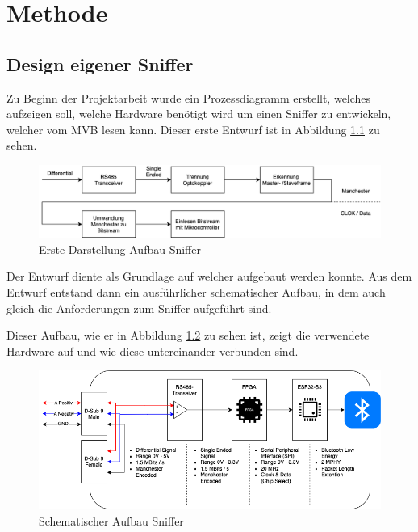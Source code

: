 \chapter{Methode} %
\label{chapter3:Methode} %

\section{Design eigener Sniffer}
\label{Design Sniffer}

Zu Beginn der Projektarbeit wurde ein Prozessdiagramm erstellt, welches aufzeigen soll, welche Hardware benötigt wird um einen Sniffer zu entwickeln, welcher vom MVB lesen kann.
Dieser erste Entwurf ist in Abbildung \ref{fig:AufbauSnifferDraft} zu sehen.

\begin{figure}[H]
    \centering
    \includegraphics[width=1\linewidth]{Figures/Chap3/Design Eigener Sniffer/Draft_Aufbau_Sniffer.png}
    \caption{Erste Darstellung Aufbau Sniffer}
    \label{fig:AufbauSnifferDraft}
\end{figure}

Der Entwurf diente als Grundlage auf welcher aufgebaut werden konnte. Aus dem Entwurf entstand dann
ein ausführlicher schematischer Aufbau, in dem auch gleich die Anforderungen zum Sniffer aufgeführt
sind. 

Dieser Aufbau, wie er in Abbildung \ref{fig:AufbauSniffer} zu sehen ist, zeigt die verwendete Hardware
auf und wie diese untereinander verbunden sind.

\begin{figure}[H]
    \centering
    \includegraphics[width=0.9\linewidth]{Figures/Chap3/Design Eigener Sniffer/Aufbau_Sniffer.png}
    \caption{Schematischer Aufbau Sniffer}
    \label{fig:AufbauSniffer}
\end{figure}



